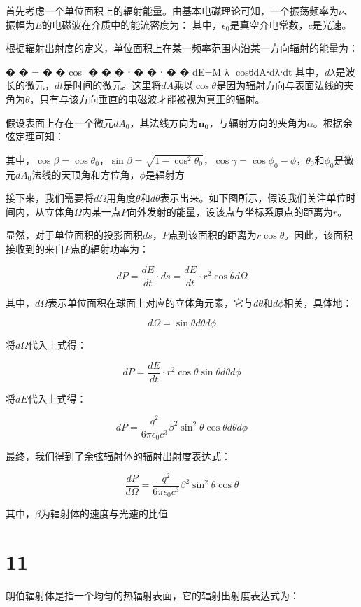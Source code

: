\documentclass[12pt, a4paper, oneside]{article}
\begin{document}
\begin{spacing}{2.0}
首先考虑一个单位面积上的辐射能量。由基本电磁理论可知，一个振荡频率为$\nu$、振幅为$E$的电磁波在介质中的能流密度为：
其中，$\epsilon_0$是真空介电常数，$c$是光速。

根据辐射出射度的定义，单位面积上在某一频率范围内沿某一方向辐射的能量为：

�
�
=
�
�
cos
⁡
�
�
�
⋅
�
�
⋅
�
�
dE=M 
λ
​
 cosθdA⋅dλ⋅dt
其中，$d\lambda$是波长的微元，$dt$是时间的微元。这里将$dA$乘以$\cos{\theta}$是因为辐射方向与表面法线的夹角为$\theta$，只有与该方向垂直的电磁波才能被视为真正的辐射。

假设表面上存在一个微元$dA_0$，其法线方向为$\mathbf{n_0}$，与辐射方向的夹角为$\alpha$。根据余弦定理可知：

其中，$\cos{\beta} = \cos{\theta_0}$，$\sin{\beta} = \sqrt{1 - \cos^2{\theta_0}}$，$\cos{\gamma} = \cos{\phi_0 - \phi}$，$\theta_0$和$\phi_0$是微元$dA_0$法线的天顶角和方位角，$\phi$是辐射方

接下来，我们需要将$d\Omega$用角度$\theta$和$d\theta$表示出来。如下图所示，假设我们关注单位时间内，从立体角$\Omega$内某一点$P$向外发射的能量，设该点与坐标系原点的距离为$r$。


显然，对于单位面积的投影面积$ds$，$P$点到该面积的距离为$r\cos\theta$。因此，该面积接收到的来自$P$点的辐射功率为：

$$ dP = \frac{dE}{dt}\cdot ds = \frac{dE}{dt}\cdot r^2\cos\theta d\Omega $$

其中，$d\Omega$表示单位面积在球面上对应的立体角元素，它与$d\theta$和$d\phi$相关，具体地：

$$ d\Omega = \sin\theta d\theta d\phi $$

将$d\Omega$代入上式得：

$$ dP = \frac{dE}{dt}\cdot r^2\cos\theta \sin\theta d\theta d\phi $$

将$dE$代入上式得：

$$ dP = \frac{q^2}{6\pi\epsilon_0c^3}\beta^2\sin^2\theta \cos\theta d\theta d\phi $$

最终，我们得到了余弦辐射体的辐射出射度表达式：

$$ \frac{dP}{d\Omega} = \frac{q^2}{6\pi\epsilon_0c^3}\beta^2\sin^2\theta \cos\theta $$

其中，$\beta$为辐射体的速度与光速的比值



\section{11}
朗伯辐射体是指一个均匀的热辐射表面，它的辐射出射度表达式为：


\end{spacing}
\end{document}
